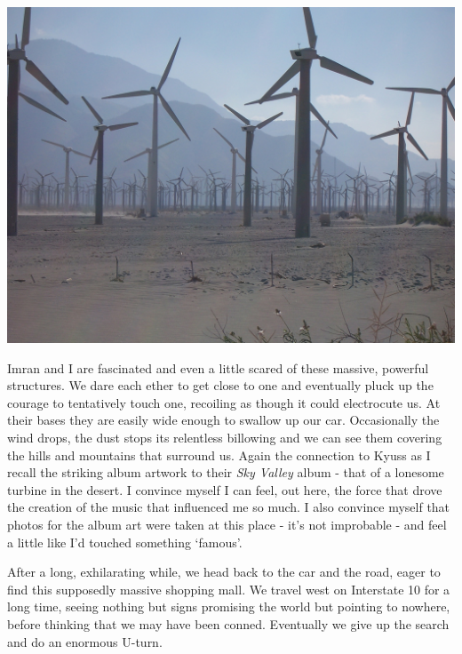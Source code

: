 \documentclass[a5paper,titlepage,11pt]{book}
\begin{document}
\begin{center}\includegraphics[width=\textwidth]{gfx/100_1636}\end{center}

Imran and I are fascinated and even a little scared of these massive, powerful structures.  We dare each ether to get close to one and eventually pluck up the courage to tentatively touch one, recoiling as though it could electrocute us.  At their bases they are easily wide enough to swallow up our car.  Occasionally the wind drops, the dust stops its relentless billowing and we can see them covering the hills and mountains that surround us.  Again the connection to Kyuss as I recall the striking album artwork to their \emph{Sky Valley} album - that of a lonesome turbine in the desert.  I convince myself I can feel, out here, the force that drove the creation of the music that influenced me so much.  I also convince myself that photos for the album art were taken at this place - it's not improbable - and feel a little like I'd touched something `famous'.

After a long, exhilarating while, we head back to the car and the road, eager to find this supposedly massive shopping mall.  We travel west on Interstate 10 for a long time, seeing nothing but signs promising the world but pointing to nowhere, before thinking that we may have been conned.  Eventually we give up the search and do an enormous U-turn.
\end{document}

